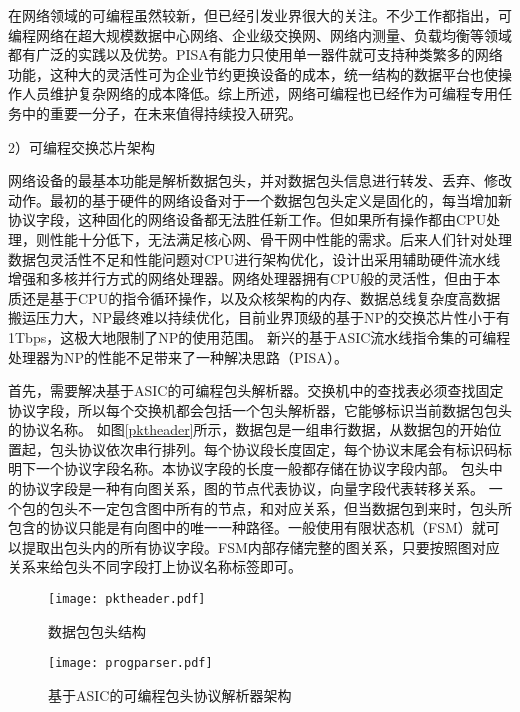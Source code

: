 在网络领域的可编程虽然较新，但已经引发业界很大的关注。不少工作都指出，可编程网络在超大规模数据中心网络、企业级交换网、网络内测量、负载均衡等领域都有广泛的实践以及优势。PISA有能力只使用单一器件就可支持种类繁多的网络功能，这种大的灵活性可为企业节约更换设备的成本，统一结构的数据平台也使操作人员维护复杂网络的成本降低。综上所述，网络可编程也已经作为可编程专用任务中的重要一分子，在未来值得持续投入研究。

2）可编程交换芯片架构

网络设备的最基本功能是解析数据包头，并对数据包头信息进行转发、丢弃、修改动作。最初的基于硬件的网络设备对于一个数据包包头定义是固化的，每当增加新协议字段，这种固化的网络设备都无法胜任新工作。但如果所有操作都由CPU处理，则性能十分低下，无法满足核心网、骨干网中性能的需求。后来人们针对处理数据包灵活性不足和性能问题对CPU进行架构优化，设计出采用辅助硬件流水线增强和多核并行方式的网络处理器。网络处理器拥有CPU般的灵活性，但由于本质还是基于CPU的指令循环操作，以及众核架构的内存、数据总线复杂度高数据搬运压力大，NP最终难以持续优化，目前业界顶级的基于NP的交换芯片性小于有1Tbps，这极大地限制了NP的使用范围。
新兴的基于ASIC流水线指令集的可编程处理器为NP的性能不足带来了一种解决思路（PISA）。

首先，需要解决基于ASIC的可编程包头解析器。交换机中的查找表必须查找固定协议字段，所以每个交换机都会包括一个包头解析器，它能够标识当前数据包包头的协议名称。
如图\ref{pktheader}所示，数据包是一组串行数据，从数据包的开始位置起，包头协议依次串行排列。每个协议段长度固定，每个协议末尾会有标识码标明下一个协议字段名称。本协议字段的长度一般都存储在协议字段内部。
包头中的协议字段是一种有向图关系，图的节点代表协议，向量字段代表转移关系。
一个包的包头不一定包含图中所有的节点，和对应关系，但当数据包到来时，包头所包含的协议只能是有向图中的唯一一种路径。一般使用有限状态机（FSM）就可以提取出包头内的所有协议字段。FSM内部存储完整的图关系，只要按照图对应关系来给包头不同字段打上协议名称标签即可。

\begin{figure}[htbp]
	\centering
	\begin{minipage}[t]{0.48\textwidth}
		\centering
		\texttt{[image: pktheader.pdf]}
		\caption{数据包包头结构} \label{pktheader}
	\end{minipage}
	\begin{minipage}[t]{0.48\textwidth}
		\centering
		\texttt{[image: progparser.pdf]}
		\caption{基于ASIC的可编程包头协议解析器架构} \label{progparser}
	\end{minipage}
\end{figure}


